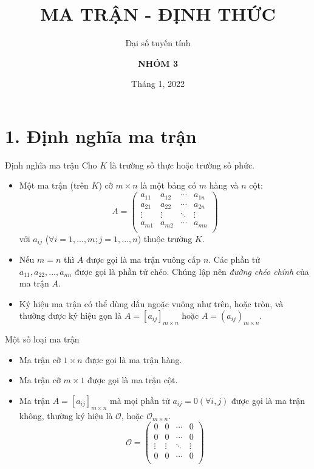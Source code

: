 \documentclass[pdf,10pt]{beamer}
\title{\textbf{MA TRẬN - ĐỊNH THỨC}}
\subtitle{Đại số tuyến tính}
\author{\textbf{NHÓM 3}}
\institute{\textcolor{red}{\textbf{Đại học Bách Khoa Hà Nội}}}
\date{Tháng 1, 2022}
\begin{document}

\begin{frame}
	\titlepage
\end{frame}

\section{1. Định nghĩa ma trận}
\begin{frame}{Định nghĩa ma trận}
	Cho $K$ là trường số thực hoặc trường số phức.
	\begin{itemize}
		\item Một ma trận (trên $K$) cỡ $m\times n$ là một bảng có $m$ hàng và $n$ cột:
		    \begin{displaymath}
			A =
			\left (
			\begin{array}{cccc}
				a_{11} & a_{12} & \cdots & a_{1n} \\
				a_{21} & a_{22} & \cdots & a_{2n} \\
				\vdots & \vdots & \ddots &\vdots \\
				a_{m1} & a_{m2} & \cdots & a_{mn} \\
			\end{array}
			\right )
		\end{displaymath}
		với $a_{ij}$ ($\forall i=1,...,m;j=1,...,n$) thuộc trường $K$.
		\item Nếu $m=n$ thì $A$ được gọi là ma trận vuông cấp $n$. Các phần tử $a_{11},a_{22},...,a_{nn}$ được gọi là phần tử chéo. Chúng lập nên \emph{đường chéo chính} của ma trận $A$.
		\item Ký hiệu ma trận có thể dùng dấu ngoặc vuông như trên, hoặc tròn, và thường được ký hiệu gọn là $A= [a_{ij}]_{m\times n}$ hoặc $A= (a_{ij})_{m\times n}$.
	\end{itemize}
\end{frame}

\begin{frame}{Một số loại ma trận}
	\begin{itemize}
		\item Ma trận cỡ $1\times n$ được gọi là ma trận hàng.
		\item Ma trận cỡ $m\times 1$ được gọi là ma trận cột.
		\item Ma trận $A= [a_{ij}]_{m\times n}$ mà mọi phần tử $a_{ij}=0 (\forall i,j)$ được gọi là ma trận không, thường ký hiệu là $\mathcal{O}$, hoặc $\mathcal{O}_{m\times n}$.
		\begin{displaymath}
			\mathcal{O} = 
			\left (
			\begin{array}{cccc}
				0  & 0 & \cdots & 0  \\
				0  & 0 & \cdots & 0  \\
				\vdots & \vdots & \ddots &\vdots \\
				0  & 0 & \cdots & 0  \\
			\end{array}
			\right )
		\end{displaymath}
	\end{itemize}
\end{frame}
\end{document}
